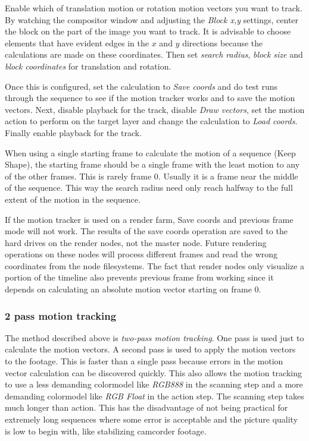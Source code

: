 Enable which of translation motion or rotation motion vectors you want to track. By watching the compositor window and adjusting the \textit{Block x,y} settings, center the block on the part of the image you want to track. It is advisable to choose elements that have evident edges in the $x$ and $y$ directions because the calculations are made on these coordinates. Then set \textit{search radius}, \textit{block size} and \textit{block coordinates} for translation and rotation.

Once this is configured, set the calculation to \textit{Save coords} and do test runs through the sequence to see if the motion tracker works and to save the motion vectors. Next, disable playback for the track, disable \textit{Draw vectors}, set the motion action to perform on the target layer and change the calculation to \textit{Load coords}. Finally enable playback for the track.

When using a single starting frame to calculate the motion of a sequence (Keep Shape), the starting frame should be a single frame with the least motion to any of the other frames. This is rarely frame $0$. Usually it is a frame near the middle of the sequence. This way the search radius need only reach halfway to the full extent of the motion in the sequence.

If the motion tracker is used on a render farm, Save coords and previous frame mode will not work. The results of the save coords operation are saved to the hard drives on the render nodes, not the master node. Future rendering operations on these nodes will process different frames and read the wrong coordinates from the node filesystems. The fact that render nodes only visualize a portion of the timeline also prevents previous frame from working since it depends on calculating an absolute motion vector starting on frame $0$.

\subsubsection*{2 pass motion tracking}
\label{ssub:2_pass_motion_tracking}

The method described above is \textit{two-pass motion tracking}. One pass is used just to calculate the motion vectors. A second pass is used to apply the motion vectors to the footage. This is faster than a single pass because errors in the motion vector calculation can be discovered quickly. This also allows the motion tracking to use a less demanding colormodel like \textit{RGB888} in the scanning step and a more demanding colormodel like \textit{RGB Float} in the action step. The scanning step takes much longer than action. This has the disadvantage of not being practical for extremely long sequences where some error is acceptable and the picture quality is low to begin with, like stabilizing camcorder footage.

